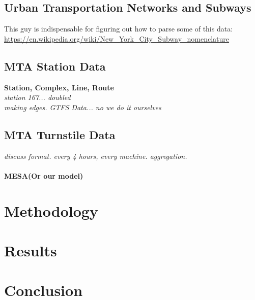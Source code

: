 \documentclass[12pt, a4, epsf] {article}
\theoremstyle{plain}
\theoremstyle{definition}
\begin{document}
\subsection*{Urban Transportation Networks and Subways}
This guy is indispensable for figuring out how to parse some of this data:\\
\url{https://en.wikipedia.org/wiki/New_York_City_Subway_nomenclature}
\subsection*{MTA Station Data}
\textbf{Station, Complex, Line, Route\\}
\textit{station 167... doubled\\}
\textit{making edges. GTFS Data... no we do it ourselves\\}
\subsection*{MTA Turnstile Data}
\textit{discuss format. every 4 hours, every machine. aggregation.\\}
\paragraph*{MESA(Or our model)}
\section*{Methodology}
\section*{Results}
\section*{Conclusion}
\nocite{*}
{}

\end{document}
